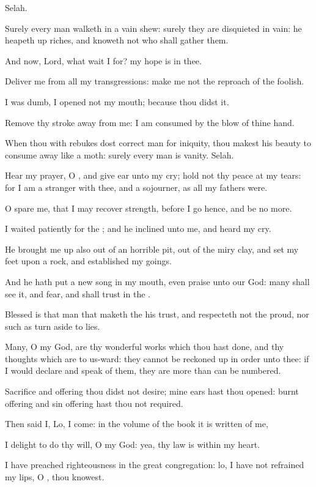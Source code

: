 Selah.

\Verse Surely every man walketh in a vain shew: surely they are disquieted in vain: he heapeth up riches, and knoweth not who shall gather them.

\Verse And now, Lord, what wait I for? my hope is in thee.

\Verse Deliver me from all my transgressions: make me not the reproach of the foolish.

\Verse I was dumb, I opened not my mouth; because thou didst it.

\Verse Remove thy stroke away from me: I am consumed by the blow of thine hand.

\Verse When thou with rebukes dost correct man for iniquity, thou makest his beauty to consume away like a moth: surely every man is vanity. Selah.

\Verse Hear my prayer, O \LORD, and give ear unto my cry; hold not thy peace at my tears: for I am a stranger with thee, and a sojourner, as all my fathers were.

\Verse O spare me, that I may recover strength, before I go hence, and be no more.




\Chapter
\Verse I waited patiently for the \LORD; and he inclined unto me, and heard my cry.

\Verse He brought me up also out of an horrible pit, out of the miry clay, and set my feet upon a rock, and established my goings.

\Verse And he hath put a new song in my mouth, even praise unto our God: many shall see it, and fear, and shall trust in the \LORD.

\Verse Blessed is that man that maketh the \LORD his trust, and respecteth not the proud, nor such as turn aside to lies.

\Verse Many, O \LORD my God, are thy wonderful works which thou hast done, and thy thoughts which are to us-ward: they cannot be reckoned up in order unto thee: if I would declare and speak of them, they are more than can be numbered.

\Verse Sacrifice and offering thou didst not desire; mine ears hast thou opened: burnt offering and sin offering hast thou not required.

\Verse Then said I, Lo, I come: in the volume of the book it is written of me,

\Verse I delight to do thy will, O my God: yea, thy law is within my heart.

\Verse I have preached righteousness in the great congregation: lo, I have not refrained my lips, O \LORD, thou knowest.

